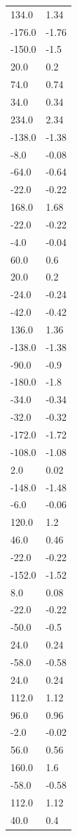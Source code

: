 \begin{longtable}{ll}
134.0 & 1.34 \\
-176.0 & -1.76 \\
-150.0 & -1.5 \\
20.0 & 0.2 \\
74.0 & 0.74 \\
34.0 & 0.34 \\
234.0 & 2.34 \\
-138.0 & -1.38 \\
-8.0 & -0.08 \\
-64.0 & -0.64 \\
-22.0 & -0.22 \\
168.0 & 1.68 \\
-22.0 & -0.22 \\
-4.0 & -0.04 \\
60.0 & 0.6 \\
20.0 & 0.2 \\
-24.0 & -0.24 \\
-42.0 & -0.42 \\
136.0 & 1.36 \\
-138.0 & -1.38 \\
-90.0 & -0.9 \\
-180.0 & -1.8 \\
-34.0 & -0.34 \\
-32.0 & -0.32 \\
-172.0 & -1.72 \\
-108.0 & -1.08 \\
2.0 & 0.02 \\
-148.0 & -1.48 \\
-6.0 & -0.06 \\
120.0 & 1.2 \\
46.0 & 0.46 \\
-22.0 & -0.22 \\
-152.0 & -1.52 \\
8.0 & 0.08 \\
-22.0 & -0.22 \\
-50.0 & -0.5 \\
24.0 & 0.24 \\
-58.0 & -0.58 \\
24.0 & 0.24 \\
112.0 & 1.12 \\
96.0 & 0.96 \\
-2.0 & -0.02 \\
56.0 & 0.56 \\
160.0 & 1.6 \\
-58.0 & -0.58 \\
112.0 & 1.12 \\
40.0 & 0.4 \\

\end{longtable}
